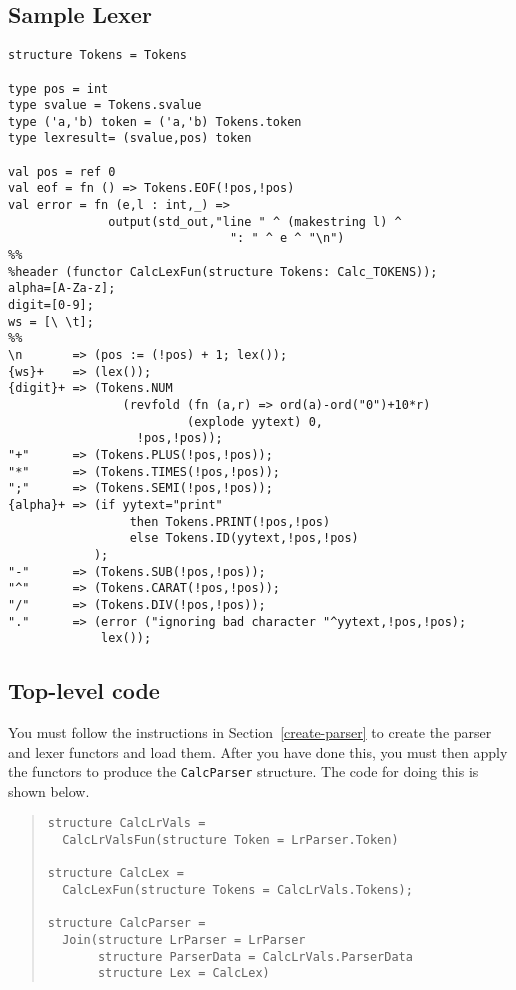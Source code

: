 \subsection{Sample Lexer}
\begin{tt}
\begin{verbatim}
structure Tokens = Tokens

type pos = int
type svalue = Tokens.svalue
type ('a,'b) token = ('a,'b) Tokens.token
type lexresult= (svalue,pos) token

val pos = ref 0
val eof = fn () => Tokens.EOF(!pos,!pos)
val error = fn (e,l : int,_) =>
              output(std_out,"line " ^ (makestring l) ^
                               ": " ^ e ^ "\n")
%%
%header (functor CalcLexFun(structure Tokens: Calc_TOKENS));
alpha=[A-Za-z];
digit=[0-9];
ws = [\ \t];
%%
\n       => (pos := (!pos) + 1; lex());
{ws}+    => (lex());
{digit}+ => (Tokens.NUM
                (revfold (fn (a,r) => ord(a)-ord("0")+10*r)
                         (explode yytext) 0,
                  !pos,!pos));
"+"      => (Tokens.PLUS(!pos,!pos));
"*"      => (Tokens.TIMES(!pos,!pos));
";"      => (Tokens.SEMI(!pos,!pos));
{alpha}+ => (if yytext="print"
                 then Tokens.PRINT(!pos,!pos)
                 else Tokens.ID(yytext,!pos,!pos)
            );
"-"      => (Tokens.SUB(!pos,!pos));
"^"      => (Tokens.CARAT(!pos,!pos));
"/"      => (Tokens.DIV(!pos,!pos));
"."      => (error ("ignoring bad character "^yytext,!pos,!pos);
             lex());
\end{verbatim}
\end{tt}
\subsection{Top-level code}

You must follow the instructions in Section~\ref{create-parser}
to create the parser and lexer functors and load them.  After you have
done this, you must then apply the functors to produce the {\tt CalcParser}
structure.  The code for doing this is shown below.
\begin{quote}
\begin{verbatim}
structure CalcLrVals =
  CalcLrValsFun(structure Token = LrParser.Token)

structure CalcLex =
  CalcLexFun(structure Tokens = CalcLrVals.Tokens);

structure CalcParser =
  Join(structure LrParser = LrParser
       structure ParserData = CalcLrVals.ParserData
       structure Lex = CalcLex)
\end{verbatim}
\end{quote}
 

